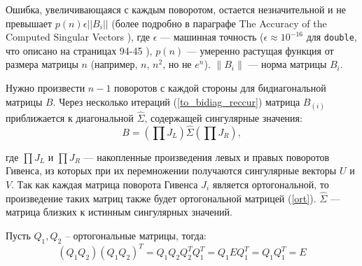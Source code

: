 \begin{note}
Ошибка, увеличивающаяся с каждым поворотом, остается незначительной и не превышает $p(n) \epsilon ||B_i||$ (более подробно в параграфе The Accuracy of the Computed Singular Vectors \cite{Demmel1990}), где  \( \epsilon \) — машинная точность (\( \epsilon \approx 10^{-16} \) для \texttt{double}, что описано на страницах 94-45 \cite{Golub2013}), \( p(n) \) — умеренно растущая функция от размера матрицы \( n \) (например, \( n \), \( n^2 \), но не \( e^n \)). \( \|B_i\| \) — норма матрицы \( B_i \).
\end{note}

Нужно произвести \( n-1 \) поворотов с каждой стороны для бидиагональной матрицы \( B \). Через несколько итераций (\ref{to_bidiag_reccur}) матрица \( B_{(i)} \) приближается к диагональной \( \widehat{\Sigma} \), содержащей сингулярные значения:
\begin{equation}
B = \left( \prod J_L \right) \widehat{\Sigma} \left( \prod J_R \right),
\end{equation}

где \( \prod J_L \) и \( \prod J_R \) — накопленные произведения левых и правых поворотов Гивенса, из которых при их перемножении получаются сингулярные векторы \( U \) и \( V \). Так как каждая матрица поворота Гивенса $J_i$ является ортогональной, то произведение таких матриц также будет ортогональной матрицей (\ref{ort}). $\widehat{\Sigma}$ — матрица близких к истинным сингулярных значений.
\begin{claim} 
    Пусть $Q_1, Q_2$ -- ортогональные матрицы, тогда: 
    \begin{equation} \label{ort}
        (Q_1Q_2)(Q_1Q_2)^T=Q_1Q_2Q_2^TQ_1^T=Q_1EQ_1^T=Q_1Q_1^T=E
    \end{equation}
\end{claim}



